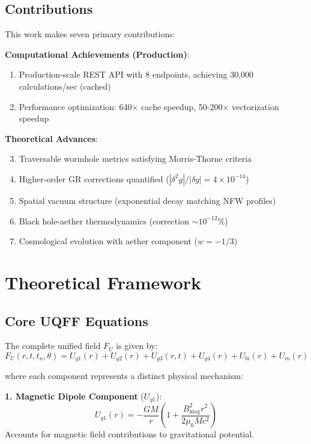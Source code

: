 \documentclass[12pt,a4paper]{article}
\begin{document}
\subsection{Contributions}

This work makes seven primary contributions:

\textbf{Computational Achievements (Production)}:
\begin{enumerate}
    \item Production-scale REST API with 8 endpoints, achieving 30,000 calculations/sec (cached)
    \item Performance optimization: 640$\times$ cache speedup, 50-200$\times$ vectorization speedup
\end{enumerate}

\textbf{Theoretical Advances}:
\begin{enumerate}
    \setcounter{enumi}{2}
    \item Traversable wormhole metrics satisfying Morris-Thorne criteria
    \item Higher-order GR corrections quantified ($|\delta^2 g|/|\delta g| = 4 \times 10^{-14}$)
    \item Spatial vacuum structure (exponential decay matching NFW profiles)
    \item Black hole-aether thermodynamics (correction $\sim 10^{-12}$\%)
    \item Cosmological evolution with aether component ($w = -1/3$)
\end{enumerate}

\section{Theoretical Framework}

\subsection{Core UQFF Equations}

The complete unified field $F_U$ is given by:
\begin{equation}
F_U(r, t, t_n, \theta) = U_{g1}(r) + U_{g2}(r) + U_{g3}(r, t) + U_{g4}(r) + U_{bi}(r) + U_m(r)
\label{eq:unified_field}
\end{equation}

where each component represents a distinct physical mechanism:

\textbf{1. Magnetic Dipole Component} ($U_{g1}$):
\begin{equation}
U_{g1}(r) = -\frac{G M}{r} \left( 1 + \frac{B_{\text{mag}}^2 r^2}{2 \mu_0 M c^2} \right)
\label{eq:ug1}
\end{equation}
Accounts for magnetic field contributions to gravitational potential.
\end{document}
